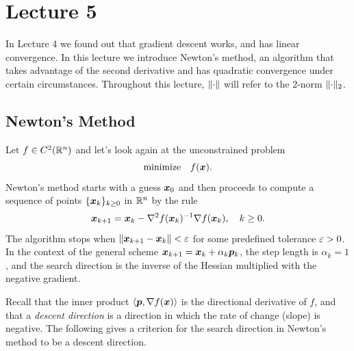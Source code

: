 %
%
% 


\chapter*{Lecture 5}
\addtocounter{chapter}{5}
\addtocounter{section}{0}


In Lecture 4 we found out that gradient descent works, and has linear convergence. In this lecture we introduce Newton's method, an algorithm that takes advantage of the second derivative and has quadratic convergence under certain circumstances. Throughout this lecture, $\Vert {\cdot}\Vert$ will refer to the $2$-norm $\Vert {\cdot}\Vert_2$.

\section{Newton's Method}
Let $f\in C^2(\mathbb{R}^n)$ and let's look again at the unconstrained problem
\begin{equation*}
 \text{minimize}\quad f(\bm{x}).
\end{equation*}
Newton's method starts with a guess $\bm{x}_0$ and then proceeds to compute a sequence of points $\{\bm{x}_k\}_{k\geq 0}$ in $\mathbb{R}^n$ by the rule
\begin{equation}\label{eq:newton}
 \bm{x}_{k+1} = \bm{x}_k - \nabla^2 f(\bm{x}_k)^{-1}\nabla f(\bm{x}_k), \quad k\geq 0.
\end{equation}
The algorithm stops when $\Vert {\bm{x}_{k+1}-\bm{x}_k}\Vert<\varepsilon$ for some predefined tolerance $\varepsilon>0$.
In the context of the general scheme $\bm{x}_{k+1}=\bm{x}_k+\alpha_k\bm{p}_k$, the step length is $\alpha_k=1$, and the search direction is the inverse of the Hessian multiplied with the negative gradient. 

Recall that the inner product $\langle {\bm{p}}, {\nabla f(\bm{x})} \rangle$ is the directional
derivative of $f$,
and that a {\em descent direction} is a direction in which the rate of change (slope) is negative. The following gives a criterion for the search direction in Newton's method to be a descent direction.

